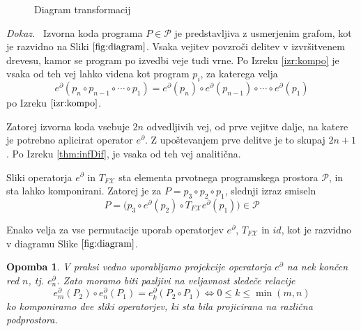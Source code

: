 \documentclass[a4paper, 12pt]{book}
\newcommand{\X}{\mathcal{X}}
\newcommand{\dP}{\mathcal{P}}
\newcommand{\D}{\partial}
\newtheorem{opomba}{Opomba}[chapter]
\newenvironment{dokaz}{\emph{Dokaz.}\ }{\hspace{\fill}{$\Box$}}
\begin{document}
\begin{figure}
\begin{center}
\caption{Diagram transformacij} \label{fig:diagram}
\end{center}
\end{figure}
\begin{dokaz}
	Izvorna koda programa $P\in\dP$ je predstavljiva z usmerjenim grafom, kot je razvidno na Sliki $\ref{fig:diagram}$.
	Vsaka vejitev povzroči delitev v izvršitvenem drevesu, kamor se program po izvedbi veje tudi vrne. Po Izreku \ref{izr:kompo} je vsaka od teh vej lahko videna kot program $p_i$, za katerega velja
	$$e^\D(p_n\circ p_{n-1}\circ\cdots\circ p_1)=e^\D(p_n)\circ e^\D(p_{n-1})\circ\cdots\circ e^\D(p_1)$$ po Izreku $\ref{izr:kompo}$.
	
	Zatorej izvorna koda vsebuje $2n$ odvedljivih vej, od prve vejitve dalje, na katere je potrebno aplicirat operator $e^\D$. Z upoštevanjem prve delitve je to skupaj $2n+1$. Po Izreku \ref{thm:infDif}, je vsaka od teh vej analitična.
\end{dokaz}

\noindent Sliki operatorja $e^\D$ in $T_{F\X}$  sta elementa prvotnega programskega prostora $\dP$, in sta lahko komponirani. Zatorej je za $P=p_3\circ p_2\circ p_1$, slednji izraz smiseln
\begin{equation*}\label{trd:composeOperators}
P=\Big(p_3\circ e^ \D(p_2)\circ T_{F\X}e^\D(p_1)\Big) \in \dP
\end{equation*}

\noindent Enako velja za vse permutacije uporab operatorjev $e^\D$, $T_{F\X}$ in $id$, kot je razvidno v diagramu Slike $\ref{fig:diagram}$.

\begin{opomba}
V praksi vedno uporabljamo projekcije operatorja $e^\D$ na nek končen red $n$, tj. $e^\D_n$. Zato moramo biti pazljivi na veljavnost sledeče relacije
\begin{equation*}
e^\D_m(P_2)\circ e^\D_n(P_1)=e^\D_k(P_2\circ P_1)\iff 0\le k\le \min(m,n)
\end{equation*}
ko komponiramo dve sliki operatorjev, ki sta bila projicirana na različna podprostora.
\end{opomba}
\end{document}
